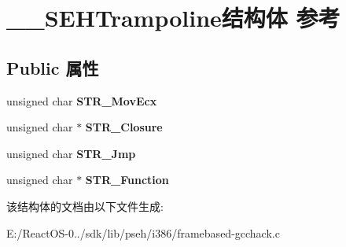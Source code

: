 \hypertarget{struct_____s_e_h_trampoline}{}\section{\+\_\+\+\_\+\+S\+E\+H\+Trampoline结构体 参考}
\label{struct_____s_e_h_trampoline}
\subsection*{Public 属性}
\begin{DoxyCompactItemize}
\item 
\mbox{\label{struct_____s_e_h_trampoline_a8b20ff32dea06fa226acd9087183eeb8}} 
unsigned char {\bfseries S\+T\+R\+\_\+\+Mov\+Ecx}
\item 
\mbox{\label{struct_____s_e_h_trampoline_a29675b803004a2dae14dcead36c06272}} 
unsigned char $\ast$ {\bfseries S\+T\+R\+\_\+\+Closure}
\item 
\mbox{\label{struct_____s_e_h_trampoline_aee64fd504af1d6be8c037b534697ebd2}} 
unsigned char {\bfseries S\+T\+R\+\_\+\+Jmp}
\item 
\mbox{\label{struct_____s_e_h_trampoline_ae674e0f3a2d2dbfd7ab47c927c5afb5e}} 
unsigned char $\ast$ {\bfseries S\+T\+R\+\_\+\+Function}
\end{DoxyCompactItemize}


该结构体的文档由以下文件生成\+:\begin{DoxyCompactItemize}
\item 
E\+:/\+React\+O\+S-\/0../sdk/lib/pseh/i386/framebased-\/gcchack.\+c\end{DoxyCompactItemize}
